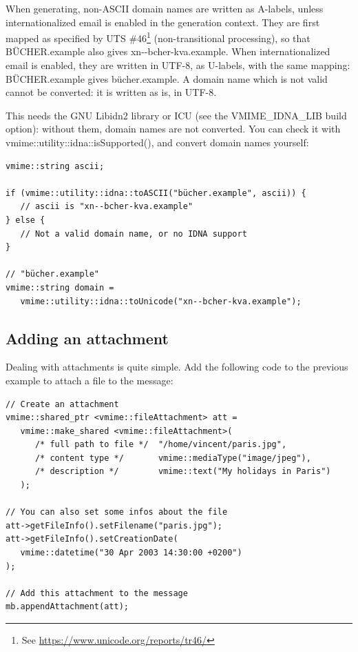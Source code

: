 When generating, non-ASCII domain names are written as A-labels, unless
internationalized email is enabled in the generation context. They are first
mapped as specified by UTS \#46\footnote{See \url{https://www.unicode.org/reports/tr46/}}
(non-transitional processing), so that {\vcode BÜCHER.example} also gives
{\vcode xn-{}-bcher-kva.example}. When internationalized email is enabled,
they are written in UTF-8, as U-labels, with the same mapping:
{\vcode BÜCHER.example} gives {\vcode bücher.example}. A domain name which is
not valid cannot be converted: it is written as is, in UTF-8.

This needs the GNU Libidn2 library or ICU (see the {\vcode VMIME\_IDNA\_LIB}
build option): without them, domain names are not converted. You can check it
with {\vcode vmime::utility::idna::isSupported()}, and convert domain names
yourself:

\begin{lstlisting}
vmime::string ascii;

if (vmime::utility::idna::toASCII("bücher.example", ascii)) {
   // ascii is "xn--bcher-kva.example"
} else {
   // Not a valid domain name, or no IDNA support
}

// "bücher.example"
vmime::string domain =
   vmime::utility::idna::toUnicode("xn--bcher-kva.example");
\end{lstlisting}


\subsection{Adding an attachment} %

Dealing with attachments is quite simple. Add the following code to the
previous example to attach a file to the message:

\begin{lstlisting}[caption={Building a message with an attachment using
{\vcode vmime::messageBuilder}}]
// Create an attachment
vmime::shared_ptr <vmime::fileAttachment> att =
   vmime::make_shared <vmime::fileAttachment>(
      /* full path to file */  "/home/vincent/paris.jpg",
      /* content type */       vmime::mediaType("image/jpeg"),
      /* description */        vmime::text("My holidays in Paris")
   );

// You can also set some infos about the file
att->getFileInfo().setFilename("paris.jpg");
att->getFileInfo().setCreationDate(
   vmime::datetime("30 Apr 2003 14:30:00 +0200")
);

// Add this attachment to the message
mb.appendAttachment(att);
\end{lstlisting}


